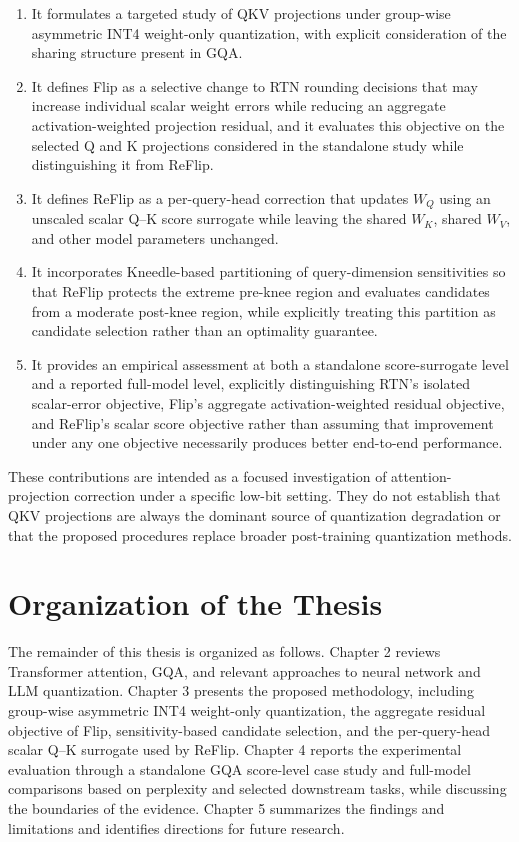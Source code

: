 \begin{enumerate}
    \item It formulates a targeted study of QKV projections under group-wise asymmetric INT4 weight-only quantization, with explicit consideration of the sharing structure present in GQA.
    \item It defines Flip as a selective change to RTN rounding decisions that may increase individual scalar weight errors while reducing an aggregate activation-weighted projection residual, and it evaluates this objective on the selected Q and K projections considered in the standalone study while distinguishing it from ReFlip.
    \item It defines ReFlip as a per-query-head correction that updates \(W_Q\) using an unscaled scalar Q--K score surrogate while leaving the shared \(W_K\), shared \(W_V\), and other model parameters unchanged.
    \item It incorporates Kneedle-based partitioning of query-dimension sensitivities so that ReFlip protects the extreme pre-knee region and evaluates candidates from a moderate post-knee region, while explicitly treating this partition as candidate selection rather than an optimality guarantee.
    \item It provides an empirical assessment at both a standalone score-surrogate level and a reported full-model level, explicitly distinguishing RTN's isolated scalar-error objective, Flip's aggregate activation-weighted residual objective, and ReFlip's scalar score objective rather than assuming that improvement under any one objective necessarily produces better end-to-end performance.
\end{enumerate}

These contributions are intended as a focused investigation of attention-projection correction under a specific low-bit setting. They do not establish that QKV projections are always the dominant source of quantization degradation or that the proposed procedures replace broader post-training quantization methods.

\section{Organization of the Thesis}

{\raggedright
The remainder of this thesis is organized as follows. Chapter 2 reviews Trans\-former attention, GQA, and relevant approaches to neural network and LLM quanti\-zation. Chapter 3 presents the proposed methodology, including group-wise asymmetric INT4 weight-only quanti\-zation, the aggregate residual objective of Flip, sensitivity-based candidate selection, and the per-query-head scalar Q--K surrogate used by ReFlip. Chapter 4 reports the experimental evaluation through a standalone GQA score-level case study and full-model comparisons based on perplexity and selected downstream tasks, while discussing the boundaries of the evidence. Chapter 5 summarizes the findings and limitations and identifies directions for future research.
\par}
